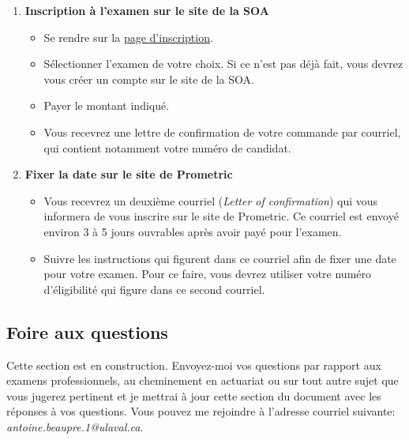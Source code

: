 \begin{enumerate}
\item \textbf{Inscription à l'examen sur le site de la SOA}
\begin{itemize}
\item Se rendre sur la \href{https://www.soa.org/Education/Exam-Req/Registration/edu-registration.aspx}{page d'inscription}. 
\item Sélectionner l'examen de votre choix. Si ce n'est pas déjà fait, vous devrez vous créer un compte sur le site de la SOA.
\item Payer le montant indiqué.
\item Vous recevrez une lettre de confirmation de votre commande par courriel, qui contient notamment votre numéro de candidat.
\end{itemize}\vspace{\baselineskip}

\item \textbf{Fixer la date sur le site de Prometric}
\begin{itemize}
\item Vous recevrez un deuxième courriel (\textit{Letter of confirmation}) qui vous informera de vous inscrire sur le site de Prometric. Ce courriel est envoyé environ 3 à 5 jours ouvrables après avoir payé pour l'examen.
\item Suivre les instructions qui figurent dans ce courriel afin de fixer une date pour votre examen. Pour ce faire, vous devrez utiliser votre numéro d'éligibilité qui figure dans ce second courriel.
\end{itemize}
\end{enumerate}

\newpage
\subsection*{Foire aux questions}
\label{subsec:faq}
Cette section est en construction. Envoyez-moi vos questions par rapport aux examens professionnels, au cheminement en actuariat ou sur tout autre sujet que vous jugerez pertinent et je mettrai à jour cette section du document avec les réponses à vos questions. Vous pouvez me rejoindre à l'adresse courriel suivante: \emph{antoine.beaupre.1@ulaval.ca}.